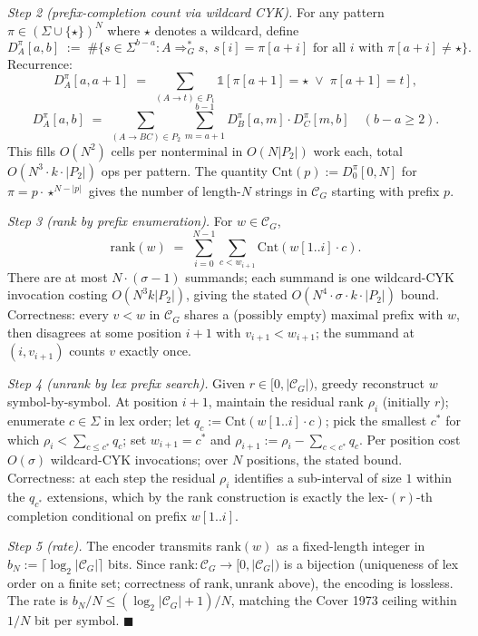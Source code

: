 \documentclass[
]{article}
\begin{document}
\emph{Step 2 (prefix-completion count via wildcard CYK).} For any
pattern $\pi \in (\Sigma \cup \{\star\})^N$ where $\star$ denotes a
wildcard, define
\[
D_A^\pi[a, b] \;:=\; \#\bigl\{ s \in \Sigma^{b-a} : A \Rightarrow_G^\ast s,
\; s[i] = \pi[a + i] \text{ for all } i \text{ with }
\pi[a + i] \neq \star \bigr\}.
\]
Recurrence:
\[
D_A^\pi[a, a+1] \;=\; \sum_{(A \to t) \in P_1}
\mathbb{1}[\pi[a+1] = \star \;\vee\; \pi[a+1] = t],
\]
\[
D_A^\pi[a, b] \;=\; \sum_{(A \to BC) \in P_2} \sum_{m=a+1}^{b-1}
D_B^\pi[a, m] \cdot D_C^\pi[m, b]
\quad (b - a \geq 2).
\]
This fills $O(N^2)$ cells per nonterminal in $O(N |P_2|)$ work each,
total $O(N^3 \cdot k \cdot |P_2|)$ ops per pattern. The quantity
$\mathrm{Cnt}(p) := D_0^\pi[0, N]$ for $\pi = p \cdot \star^{N - |p|}$
gives the number of length-$N$ strings in $\mathcal{C}_G$ starting
with prefix $p$.

\emph{Step 3 (rank by prefix enumeration).} For $w \in \mathcal{C}_G$,
\[
\mathrm{rank}(w) \;=\; \sum_{i=0}^{N-1} \sum_{c < w_{i+1}}
\mathrm{Cnt}(w[1..i] \cdot c).
\]
There are at most $N \cdot (\sigma - 1)$ summands; each summand is one
wildcard-CYK invocation costing $O(N^3 k |P_2|)$, giving the stated
$O(N^4 \cdot \sigma \cdot k \cdot |P_2|)$ bound. Correctness: every
$v < w$ in $\mathcal{C}_G$ shares a (possibly empty) maximal prefix
with $w$, then disagrees at some position $i+1$ with $v_{i+1} < w_{i+1}$;
the summand at $(i, v_{i+1})$ counts $v$ exactly once.

\emph{Step 4 (unrank by lex prefix search).} Given $r \in [0,
|\mathcal{C}_G|)$, greedy reconstruct $w$ symbol-by-symbol. At position
$i+1$, maintain the residual rank $\rho_i$ (initially $r$); enumerate
$c \in \Sigma$ in lex order; let $q_c := \mathrm{Cnt}(w[1..i] \cdot c)$;
pick the smallest $c^\ast$ for which $\rho_i < \sum_{c \leq c^\ast} q_c$;
set $w_{i+1} = c^\ast$ and $\rho_{i+1} := \rho_i - \sum_{c < c^\ast} q_c$.
Per position cost $O(\sigma)$ wildcard-CYK invocations; over $N$
positions, the stated bound. Correctness: at each step the residual
$\rho_i$ identifies a sub-interval of size $1$ within the $q_{c^\ast}$
extensions, which by the rank construction is exactly the lex-$(r)$-th
completion conditional on prefix $w[1..i]$.

\emph{Step 5 (rate).} The encoder transmits $\mathrm{rank}(w)$ as a
fixed-length integer in $b_N := \lceil \log_2 |\mathcal{C}_G| \rceil$
bits. Since $\mathrm{rank}: \mathcal{C}_G \to [0, |\mathcal{C}_G|)$ is
a bijection (uniqueness of lex order on a finite set; correctness of
$\mathrm{rank}, \mathrm{unrank}$ above), the encoding is lossless. The
rate is $b_N / N \leq (\log_2 |\mathcal{C}_G| + 1)/N$, matching the
Cover 1973 ceiling within $1/N$ bit per symbol. \hfill$\blacksquare$
\end{document}

